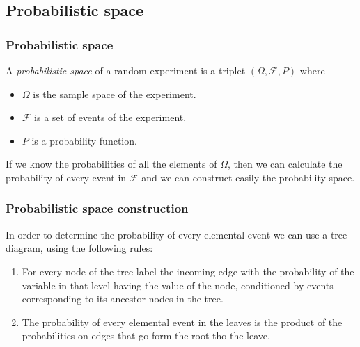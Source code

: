 \subsection{Probabilistic space}

\begin{frame}
\frametitle{Probabilistic space}
\begin{definition}
A \emph{probabilistic space} of a random experiment is a triplet $(\Omega,\mathcal{F},P)$ where
\begin{itemize}
\item $\Omega$ is the sample space of the experiment.
\item $\mathcal{F}$ is a set of events of the experiment.
\item $P$ is a probability function. 
\end{itemize} 
\end{definition}

If we know the probabilities of all the elements of $\Omega$, then we can calculate the probability of every event in
$\mathcal{F}$ and we can construct easily the probability space. 
\end{frame}


\begin{frame}
\frametitle{Probabilistic space construction}
In order to determine the probability of every elemental event we can use a tree diagram, using the following rules:
\begin{enumerate}
\item For every node of the tree label the incoming edge with the probability of the variable in that level having the
value of the node, conditioned by events corresponding to its ancestor nodes in the tree.
\item The probability of every elemental event in the leaves is the product of the probabilities on edges
that go form the root tho the leave.
\end{enumerate}
\begin{center}
\end{center}
\end{frame}


